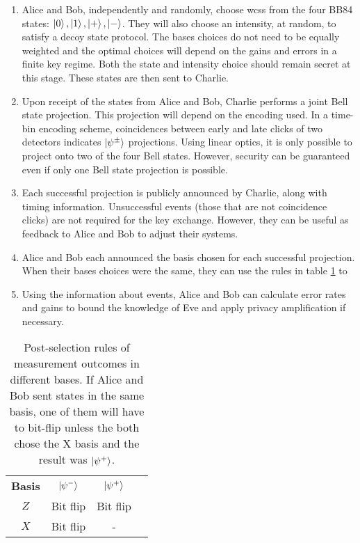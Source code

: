\begin{enumerate}
	\item {} Alice and Bob, independently and randomly, choose \acp{wcs} from the four BB84 states: $\ket{0}, \ket{1}, \ket{+}, \ket{-}$. They will also choose an intensity, at random, to satisfy a decoy state protocol. The bases choices do not need to be equally weighted and the optimal choices will depend on the gains and errors in a finite key regime. Both the state and intensity choice should remain secret at this stage. These states are then sent to Charlie. 
	\item {} Upon receipt of the states from Alice and Bob, Charlie performs a joint Bell state projection. This projection will depend on the encoding used. In a time-bin encoding scheme, coincidences between early and late clicks of two detectors indicates $\ket{\psi^\pm}$ projections. Using linear optics, it is only possible to project onto two of the four Bell states. However, security can be guaranteed even if only one Bell state projection is possible.
	\item {} Each successful projection is publicly announced by Charlie, along with timing information. Unsuccessful events (those that are not coincidence clicks) are not required for the key exchange. However, they can be useful as feedback to Alice and Bob to adjust their systems.
	\item {} Alice and Bob each announced the basis chosen for each successful projection. When their bases choices were the same, they can use the rules in table \ref{tab:mdi-outcomes} to 
	\item {} Using the information about  events, Alice and Bob can calculate error rates and gains to bound the knowledge of Eve and apply privacy amplification if necessary.
\end{enumerate}

\begin{table}[tbp]
\centering
\begin{tabular}{@{}cccc@{}}
\textbf{Basis}      & $\ket{\psi^-}$     & $\ket{\psi^+}$        \\
$Z$              & Bit flip           & Bit flip                \\
$X$              & Bit flip           & \multicolumn{1}{c}{-}   \\
\end{tabular}
\caption[Measurement outcomes in MDI-QKD]{Post-selection rules of measurement outcomes in different bases. If Alice and Bob sent states in the same basis, one of them will have to bit-flip unless the both chose the X basis and the result was $\ket{\psi^+}$.}
\label{tab:mdi-outcomes}
\end{table}


